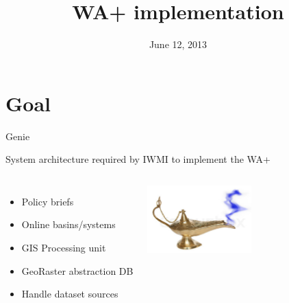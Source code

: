 \documentclass[xcolor=dvipsnames,beamer]{beamer} %
\title[WA+ implementation]
{WA+ implementation}
\author[]
{}
\institute[IWMI]
{International Water Management Institute\\
\vspace{20pt}
}
\date{June 12, 2013}
\begin{document}
\frame{
\titlepage
}

\section{Goal}
\begin{frame}[fragile]{Genie}

System architecture required by IWMI to implement the WA+
\newline

\begin{columns}[l]
\begin{itemize}
 \item Policy briefs
 \item Online basins/systems
 \item GIS Processing unit
 \item GeoRaster abstraction DB
 \item Handle dataset sources
\end{itemize}

\begin{center}
 \includegraphics[width=4cm]{lamp}
\end{center}
\end{columns}

\end{frame}
\end{document}
